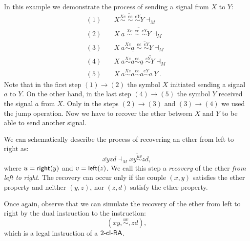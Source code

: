 \begin{example}\label{example:spread}
In this example we demonstrate the process of sending a signal from $X$ to $Y$:
$$
\begin{array}{ll}
(1) & \quad \overline{X \stackrel{Xe}{\sim} \; \stackrel{ee}{\sim} \; \stackrel{eY}{\sim} Y} \dashv_M\\
(2) & \quad X\ \underline{a}\ \overline{\stackrel{Xe}{\sim} \; \stackrel{ee}{\sim} \; \stackrel{eY}{\sim} Y} \dashv_M\\
(3) & \quad X\ a \stackrel{Xe}{\sim} \underline{a} \; \overline{\stackrel{ee}{\sim} \; \stackrel{eY}{\sim} Y} \dashv_M\\
(4) & \quad X\ a \stackrel{Xe}{\sim} a \stackrel{ee}{\sim} \underline{a}\; \overline{\stackrel{eY}{\sim} Y} \dashv_M\\
(5) & \quad X\ a \stackrel{Xe}{\sim} a \stackrel{ee}{\sim} a \stackrel{eY}{\sim} \underline{a}\ Y\;.
\end{array}
$$
Note that in the first step $(1) \to (2)$ the symbol $X$ initiated sending a signal $a$ to $Y$. On the other hand, in the last step $(4) \to (5)$ the symbol $Y$ received the signal $a$ from $X$. Only in the steps $(2) \to (3)$ and $(3) \to (4)$ we used the jump operation.
Now we have to recover the ether between $X$ and $Y$ to be able to send another signal.
\end{example}

We can schematically describe the process of recovering an ether
from left to right as:
$$\overline{x y} z d \dashv_M \overline{x y \stackrel{uv}{\sim} z} d,$$
where $u = {\sf right}(y)$ and $v = {\sf left}(z)$. We call this step a \emph{recovery} of the ether \emph{from left to right}. The recovery can occur only if the couple $(x, y)$ satisfies the ether property and neither $(y, z)$, nor $(z, d)$ satisfy the ether property.

Once again, observe that we can simulate the recovery of the ether from left to right by the dual instruction to the instruction:
$$(xy, \stackrel{uv}{\sim}, zd),$$
which is a legal instruction of a $\kclRA[2]$.

